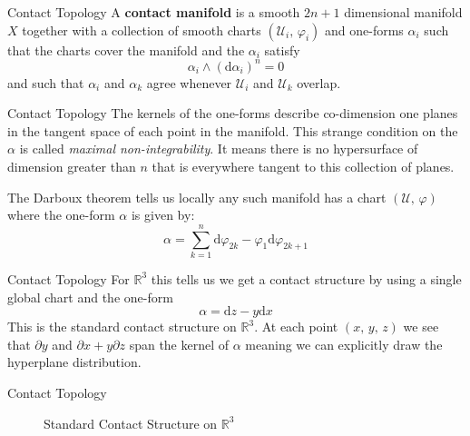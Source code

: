 \documentclass{beamer}
\begin{document}
    \begin{frame}{Contact Topology}
        A \textbf{contact manifold} is a smooth $2n+1$ dimensional
        manifold $X$ together with a
        collection of smooth charts $(\mathcal{U}_{i},\,\varphi_{i})$ and
        one-forms $\alpha_{i}$ such that the charts cover the manifold and
        the $\alpha_{i}$ satisfy
        \begin{equation}
            \alpha_{i}\land(\textrm{d}\alpha_{i})^{n}=0
        \end{equation}
        and such that $\alpha_{i}$ and $\alpha_{k}$ agree whenever
        $\mathcal{U}_{i}$ and $\mathcal{U}_{k}$ overlap.
    \end{frame}
    \begin{frame}{Contact Topology}
        The kernels of the one-forms describe co-dimension one planes in the
        tangent space of each point in the manifold.
        This strange condition on the $\alpha$ is called
        \textit{maximal non-integrability}. It means there is no hypersurface
        of dimension greater than $n$ that is everywhere tangent to this
        collection of planes.
        \par\hfill\par
        The Darboux theorem tells us locally any such manifold has a chart
        $(\mathcal{U},\,\varphi)$ where the one-form $\alpha$ is given by:
        \begin{equation}
            \alpha=\sum_{k=1}^{n}
                \textrm{d}\varphi_{2k}-\varphi_{1}\textrm{d}\varphi_{2k+1}
        \end{equation}
    \end{frame}
    \begin{frame}{Contact Topology}
        For $\mathbb{R}^{3}$ this tells us we get a contact structure by using
        a single global chart and the one-form
        \begin{equation}
            \alpha=\textrm{d}z-y\textrm{d}x
        \end{equation}
        This is the standard contact structure on $\mathbb{R}^{3}$. At each
        point $(x,\,y,\,z)$ we see that
        $\partial{y}$ and $\partial{x}+y\partial{z}$ span the kernel of
        $\alpha$ meaning we can explicitly draw the hyperplane distribution.
    \end{frame}
    \begin{frame}{Contact Topology}
        \begin{figure}
            \centering
            \caption{Standard Contact Structure on $\mathbb{R}^{3}$}
        \end{figure}
    \end{frame}
\end{document}
